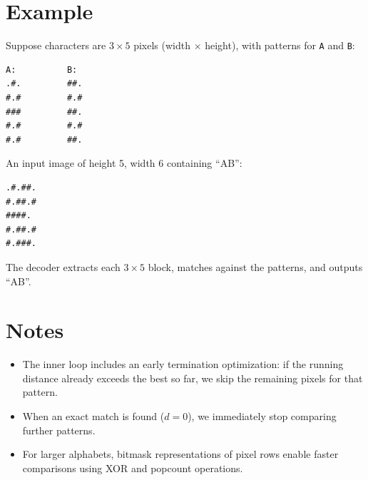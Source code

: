 \documentclass[11pt,a4paper]{article}
\begin{document}
\section{Example}

Suppose characters are $3 \times 5$ pixels (width $\times$ height), with
patterns for \texttt{A} and \texttt{B}:

\begin{verbatim}
A:          B:
.#.         ##.
#.#         #.#
###         ##.
#.#         #.#
#.#         ##.
\end{verbatim}

An input image of height 5, width 6 containing ``AB'':
\begin{verbatim}
.#.##.
#.##.#
####.
#.##.#
#.###.
\end{verbatim}

The decoder extracts each $3 \times 5$ block, matches against the patterns,
and outputs ``AB''.

\section{Notes}

\begin{itemize}
  \item The inner loop includes an early termination optimization: if the
    running distance already exceeds the best so far, we skip the remaining
    pixels for that pattern.
  \item When an exact match is found ($d = 0$), we immediately stop
    comparing further patterns.
  \item For larger alphabets, bitmask representations of pixel rows enable
    faster comparisons using XOR and popcount operations.
\end{itemize}
\end{document}
